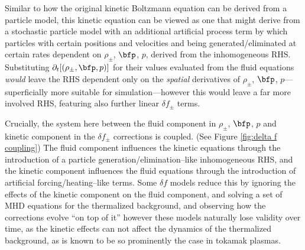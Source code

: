 
    Similar to how the original kinetic Boltzmann equation can be derived from a particle model, this kinetic equation can be viewed as one that might derive from a stochastic particle model with an additional artificial process term by which particles with certain positions and velocities and being generated/eliminated at certain rates dependent on $\rho_{\pm}$, $\bfp$, $p$, derived from the inhomogeneous RHS. Substituting $\partial_{t}[(\rho_{\pm}, \bfp, p)]$ for their values evaluated from the fluid equations \emph{would} leave the RHS dependent only on the \emph{spatial} derivatives of $\rho_{\pm}$, $\bfp$, $p$---superficially more suitable for simulation---however this would leave a far more involved RHS, featuring also further linear $\delta\!f_{\pm}$ terms.

    \line

    Crucially, the system here between the fluid component in $\rho_{\pm}$, $\bfp$, $p$ and kinetic component in the $\delta\!f_{\pm}$ corrections is coupled. (See Figure \ref{fig:delta f coupling}) The fluid component influences the kinetic equations through the introduction of a particle generation/elimination--like inhomogeneous RHS, and the kinetic component influences the fluid equations through the introduction of artificial forcing/heating--like terms. Some $\delta\!f$ models reduce this by ignoring the effects of the kinetic component on the fluid component, and solving a set of MHD equations for the thermalized background, and observing how the corrections evolve ``on top of it''  however these models naturally lose validity over time, as the kinetic effects can not affect the dynamics of the thermalized background, as is known to be so prominently the case in tokamak plasmas.

